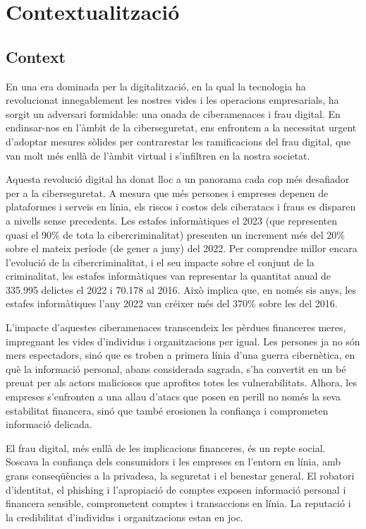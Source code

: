 \section{Contextualització} \label{sec:context}


\subsection{Context}
En una era dominada per la digitalització, en la qual la tecnologia ha revolucionat innegablement les nostres vides i les operacions empresarials, ha sorgit un adversari formidable: una onada de ciberamenaces i frau digital. En endinsar-nos en l'àmbit de la ciberseguretat, ens enfrontem a la necessitat urgent d'adoptar mesures sòlides per contrarestar les ramificacions del frau digital, que van molt més enllà de l'àmbit virtual i s'infiltren en la nostra societat.

Aquesta revolució digital ha donat lloc a un panorama cada cop més desafiador per a la ciberseguretat. A mesura que més persones i empreses depenen de plataformes i serveis en línia, els riscos i costos dels ciberatacs i fraus es disparen a nivells sense precedents. Les estafes informàtiques el 2023 (que representen quasi el 90\% de tota la cibercriminalitat) presenten un increment més del 20\% sobre el mateix període (de gener a juny) del 2022. Per comprendre millor encara l'evolució de la cibercriminalitat, i el seu impacte sobre el conjunt de la criminalitat, les estafes informàtiques van representar la quantitat anual de 335.995 delictes el 2022 i 70.178 al 2016. Això implica que, en només sis anys, les estafes informàtiques l'any 2022 van créixer més del 370\% sobre les del 2016. \cite{criminalitat}

L'impacte d'aquestes ciberamenaces transcendeix les pèrdues financeres meres, impregnant les vides d'individus i organitzacions per igual. Les persones ja no són mers espectadors, sinó que es troben a primera línia d'una guerra cibernètica, en què la informació personal, abans considerada sagrada, s'ha convertit en un bé preuat per als actors maliciosos que aprofites totes les vulnerabilitats. Alhora, les empreses s'enfronten a una allau d'atacs que posen en perill no només la seva estabilitat financera, sinó que també erosionen la confiança i comprometen informació delicada.

El frau digital, més enllà de les implicacions financeres, és un repte social. Soscava la confiança dels consumidors i les empreses en l'entorn en línia, amb grans conseqüències a la privadesa, la seguretat i el benestar general. El robatori d'identitat, el phishing i l'apropiació de comptes exposen informació personal i financera sensible, comprometent comptes i transaccions en línia. La reputació i la credibilitat d'individus i organitzacions estan en joc.

